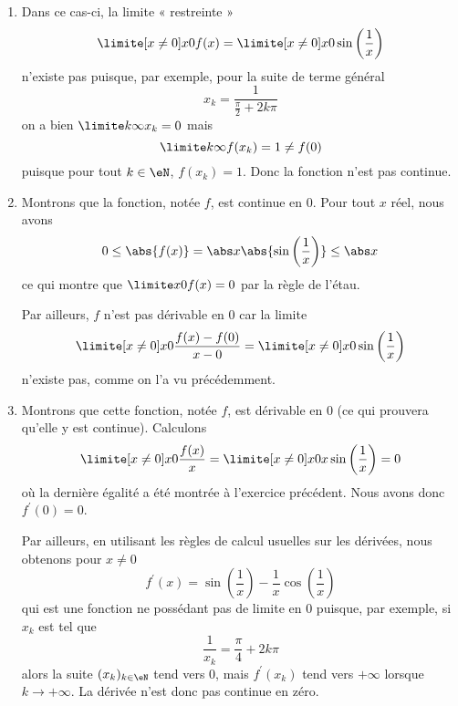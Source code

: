 \begin{example}
\begin{enumerate}
		\item
		      Dans ce cas-ci, la limite « restreinte »
		      \begin{equation*}
			      \limite[x \neq 0] x 0 f(x) = \limite[x \neq 0] x 0 \sin\left(\frac 1 x\right)
		      \end{equation*}
		      n'existe pas puisque, par exemple, pour la suite de terme général
		      \begin{equation*}
			      x_k = \frac 1 {\frac \pi 2 + 2k \pi}
		      \end{equation*}
		      on a bien $\limite k \infty x_k = 0$ mais
		      \begin{equation*}
			      \limite k \infty f(x_k) = 1 \neq f(0)
		      \end{equation*}
		      puisque pour tout $k \in \eN$, $f(x_k) = 1$. Donc la fonction n'est pas continue.

		\item
		      Montrons que la fonction, notée $f$, est continue en $0$. Pour tout $x$ réel, nous avons
		      \begin{equation*}
			      0 \leq \abs{f(x)} = \abs x \abs{\sin \left(\frac 1 x\right)} \leq
			      \abs x
		      \end{equation*}
		      ce qui montre que $\limite x 0 f(x) = 0$ par la règle de l'étau.

		      Par ailleurs, $f$ n'est pas dérivable en $0$ car la limite
		      \begin{equation*}
			      \limite[x \neq 0] x 0 \frac{f(x) - f(0)}{x-0} = \limite[x\neq 0] x 0 \sin\left(\frac{1}{x}\right)
		      \end{equation*}
		      n'existe pas, comme on l'a vu précédemment.

		\item
		      Montrons que cette fonction, notée $f$, est
		      dérivable en $0$ (ce qui prouvera qu'elle y est continue). Calculons
		      \begin{equation*}
			      \limite[x \neq 0] x 0 \frac{f(x)}{x} = \limite[x\neq 0] x 0 x \sin
			      \left(
			      \frac 1 x
			      \right) = 0
		      \end{equation*}
		      où la dernière égalité a été montrée à l'exercice précédent. Nous
		      avons donc $f^\prime(0) = 0$.

		      Par ailleurs, en utilisant les règles de calcul usuelles sur les
		      dérivées, nous obtenons pour $x \neq 0$
		      \begin{equation*}
			      f^\prime(x) = \sin
			      \left(
			      \frac 1 x
			      \right) - \frac 1 x \cos
			      \left(
			      \frac 1 x
			      \right)
		      \end{equation*}
		      qui est une fonction ne possédant pas de limite en $0$ puisque, par exemple,
		      si $x_k$ est tel que
		      \begin{equation*}
			      \frac 1{x_k} = \frac\pi4 + 2k\pi
		      \end{equation*}
		      alors la suite $(x_k)_{k\in\eN}$ tend vers $0$, mais $f^\prime(x_k)$ tend vers $+\infty$ lorsque $k \rightarrow +\infty$. La dérivée n'est donc pas continue en zéro.


\end{enumerate}
\end{example}
